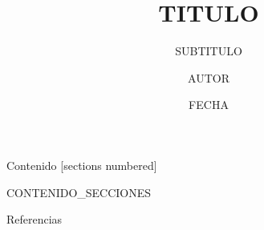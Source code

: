 \documentclass[10pt]{beamer}
\title{{{TITULO}}}
\subtitle{{{SUBTITULO}}}
\date{{{FECHA}}}
\author{{{AUTOR}}}
\institute{{{INSTITUCION}}}
\begin{document}
\maketitle

\begin{frame}{Contenido}
  [sections numbered]
  \tableofcontents[hideallsubsections]
\end{frame}

%
%
%
%

{{CONTENIDO_SECCIONES}}

\begin{frame}[allowframebreaks]{Referencias}
  \nocite{*}
  
  
\end{frame}
\end{document}
